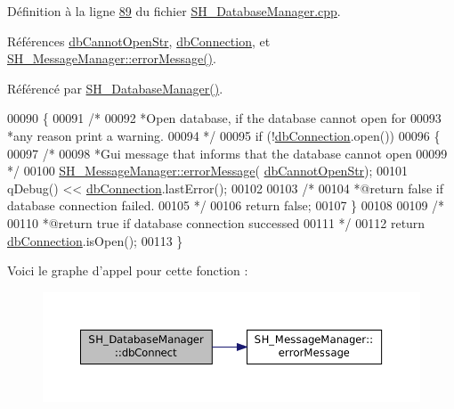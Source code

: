 Définition à la ligne \hyperlink{SH__DatabaseManager_8cpp_source_l00089}{89} du fichier \hyperlink{SH__DatabaseManager_8cpp_source}{S\-H\-\_\-\-Database\-Manager.\-cpp}.



Références \hyperlink{SH__DatabaseManager_8h_a19d48066a97c8a9a81827ccf23fd736f}{db\-Cannot\-Open\-Str}, \hyperlink{classSH__DatabaseManager_a9291f61c3abbba2c4f1567b1d8325f0e}{db\-Connection}, et \hyperlink{classSH__MessageManager_acb5615cc90f198f4768da800a5d32362}{S\-H\-\_\-\-Message\-Manager\-::error\-Message()}.



Référencé par \hyperlink{classSH__DatabaseManager_a7b5d0e372c153eb59cdab98588994904}{S\-H\-\_\-\-Database\-Manager()}.


\begin{DoxyCode}
00090 \{
00091     \textcolor{comment}{/*}
00092 \textcolor{comment}{            *Open database, if the database cannot open for
}
00093 \textcolor{comment}{            *any reason print a warning.
}
00094 \textcolor{comment}{            */}
00095     \textcolor{keywordflow}{if} (!\hyperlink{classSH__DatabaseManager_a9291f61c3abbba2c4f1567b1d8325f0e}{dbConnection}.open())
00096     \{
00097         \textcolor{comment}{/*}
00098 \textcolor{comment}{                 *Gui message that informs that the database cannot open
}
00099 \textcolor{comment}{                 */}
00100         \hyperlink{classSH__MessageManager_acb5615cc90f198f4768da800a5d32362}{SH\_MessageManager::errorMessage}(
      \hyperlink{SH__DatabaseManager_8h_a19d48066a97c8a9a81827ccf23fd736f}{dbCannotOpenStr});
00101         qDebug() << \hyperlink{classSH__DatabaseManager_a9291f61c3abbba2c4f1567b1d8325f0e}{dbConnection}.lastError();
00102 
00103         \textcolor{comment}{/*}
00104 \textcolor{comment}{                 *@return false if database connection failed.
}
00105 \textcolor{comment}{                 */}
00106         \textcolor{keywordflow}{return} \textcolor{keyword}{false};
00107     \}
00108 
00109     \textcolor{comment}{/*}
00110 \textcolor{comment}{             *@return true if database connection successed
}
00111 \textcolor{comment}{             */}
00112     \textcolor{keywordflow}{return} \hyperlink{classSH__DatabaseManager_a9291f61c3abbba2c4f1567b1d8325f0e}{dbConnection}.isOpen();
00113 \}
\end{DoxyCode}


Voici le graphe d'appel pour cette fonction \-:\nopagebreak
\begin{figure}[H]
\begin{center}
\leavevmode
\includegraphics[width=350pt]{classSH__DatabaseManager_aeb077fe5437f435c0cbe8d77d96dd846_cgraph}
\end{center}
\end{figure}





